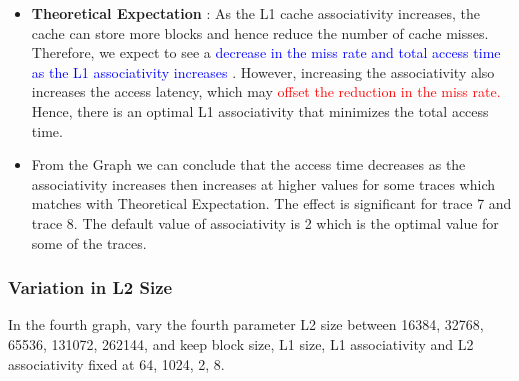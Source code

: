 \documentclass{article}
\begin{document}
\begin{itemize}
    \item  \textbf{Theoretical Expectation} : As the L1 cache associativity increases, the cache can store more blocks and hence reduce the number of cache misses. Therefore, we expect to see a \textcolor{blue}{ decrease in the miss rate and total access time as the L1 associativity increases }. However, increasing the associativity also increases the access latency, which may \textcolor{red}{ offset the reduction in the miss rate.} Hence, there is an optimal L1 associativity that minimizes the total access time.
    \item From the Graph we can conclude that the access time decreases as the associativity increases then increases at higher values for some traces which matches with Theoretical Expectation. The effect is significant for trace 7 and trace 8. The default value of associativity is 2 which is the optimal value for some of the traces.
\end{itemize}


\newpage
\subsubsection{Variation in L2 Size}
In the fourth graph, vary the fourth parameter L2 size between 16384, 32768, 65536,
131072, 262144, and keep block size, L1 size, L1 associativity and L2 associativity fixed
at 64, 1024, 2, 8.
\end{document}
